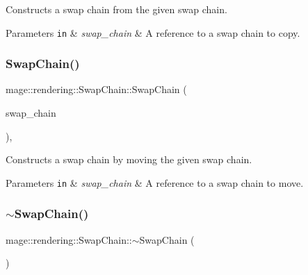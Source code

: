 Constructs a swap chain from the given swap chain.


\begin{DoxyParams}[1]{Parameters}
\mbox{\tt in}  & {\em swap\+\_\+chain} & A reference to a swap chain to copy. \\
\hline
\end{DoxyParams}
\mbox{\label{classmage_1_1rendering_1_1_swap_chain_ae6bc03d3e49c012ff4eab712cb97e248}} 
\subsubsection{\texorpdfstring{Swap\+Chain()}{SwapChain()}\hspace{0.1cm}{\footnotesize\ttfamily [3/3]}}
{\footnotesize\ttfamily mage\+::rendering\+::\+Swap\+Chain\+::\+Swap\+Chain (\begin{DoxyParamCaption}\item[{\mbox{\hyperlink{classmage_1_1rendering_1_1_swap_chain}{Swap\+Chain}} \&\&}]{swap\+\_\+chain }\end{DoxyParamCaption})\hspace{0.3cm}{\ttfamily [default]}, {\ttfamily [noexcept]}}

Constructs a swap chain by moving the given swap chain.


\begin{DoxyParams}[1]{Parameters}
\mbox{\tt in}  & {\em swap\+\_\+chain} & A reference to a swap chain to move. \\
\hline
\end{DoxyParams}
\mbox{\label{classmage_1_1rendering_1_1_swap_chain_ae554cc85a11c0126c645263e8ffb1cf4}} 
\subsubsection{\texorpdfstring{$\sim$\+Swap\+Chain()}{~SwapChain()}}
{\footnotesize\ttfamily mage\+::rendering\+::\+Swap\+Chain\+::$\sim$\+Swap\+Chain (\begin{DoxyParamCaption}{ }\end{DoxyParamCaption})\hspace{0.3cm}{\ttfamily [default]}}

